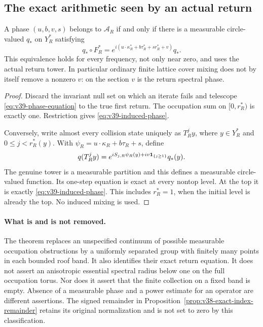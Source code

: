 \subsection{The exact arithmetic seen by an actual return}
\begin{proposition}
\label{prop:v39-induced-arithmetic}
A phase $(u,b,v,s)$ belongs to $\mathcal A_R$ if and only if there is
a measurable circle-valued $q_*$ on $Y_R^*$ satisfying
\begin{equation}\label{eq:v39-induced-phase}
 q_*\circ F_R^*
   =e^{i(u\cdot\kappa_R^*+b\tau_R^*+s r_R^*+v)}q_*.
\end{equation}
This equivalence holds for every frequency, not only near zero, and
uses the actual return tower. In particular ordinary finite lattice
cover mixing does not by itself remove a nonzero $v$: on the section
$v$ is the return spectral phase.
\end{proposition}
\begin{proof}
Discard the invariant null set on which an iterate fails and telescope
\eqref{eq:v39-phase-equation} to the true first return. The occupation
sum on $[0,r_R^*)$ is exactly one. Restriction gives
\eqref{eq:v39-induced-phase}.

Conversely, write almost every collision state uniquely as $T_R^j y$,
where $y\in Y_R^*$ and $0\le j<r_R^*(y)$. With
$\psi_R=u\cdot\kappa_R+b\tau_R+s$, define
\[
 q(T_R^jy)=e^{iS_{j,R}\psi_R(y)+iv\mathbf1_{\{j\ge1\}}}q_*(y).
\]
The genuine tower is a measurable partition and this defines a
measurable circle-valued function. Its one-step equation is exact at
every nontop level. At the top it is exactly
\eqref{eq:v39-induced-phase}. This includes $r_R^*=1$, when the
initial level is already the top. No induced mixing is used.
\end{proof}

\paragraph{What is and is not removed.}
The theorem replaces an unspecified continuum of possible measurable
occupation obstructions by a uniformly separated group with finitely
many points in each bounded roof band. It also identifies their exact
return equation. It does not assert an anisotropic essential spectral
radius below one on the full occupation torus. Nor does it assert that
the finite collection on a fixed band is empty. Absence of a measurable
phase and a power estimate for an operator are different assertions.
The signed remainder in Proposition~\ref{prop:v38-exact-index-remainder}
retains its original normalization and is not set to zero by this
classification.
